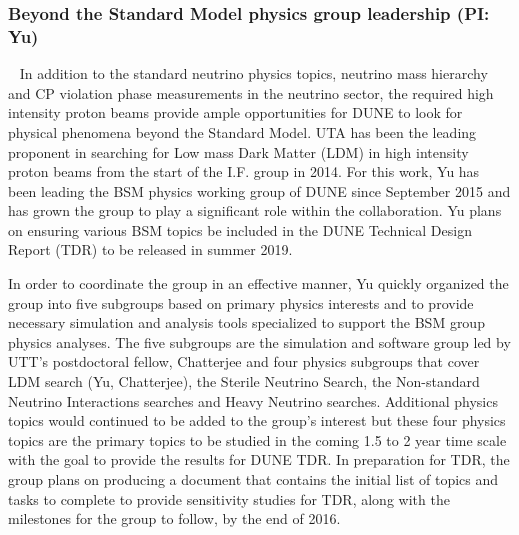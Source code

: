 %
%

%
%

%
%
\subsubsection {Beyond the Standard Model physics group leadership (PI: Yu)}~\label{sec:dune-bsm}
In addition to the standard neutrino physics topics, neutrino mass hierarchy and CP violation phase measurements in the neutrino sector, the required high intensity proton beams provide ample opportunities for DUNE to look for physical phenomena beyond the Standard Model. UTA has been the leading proponent in searching for Low mass Dark Matter (LDM) in high intensity proton beams from the start of the I.F. group in 2014. For this work, Yu has been leading the BSM physics working group of DUNE since September 2015 and has grown the group to play a significant role within the collaboration. Yu plans on ensuring various BSM topics be included in the DUNE Technical Design Report (TDR) to be released in summer 2019.

In order to coordinate the group in an effective manner, Yu quickly organized the group into five subgroups based on primary physics interests and to provide necessary simulation and analysis tools specialized to support the BSM group physics analyses.
The five subgroups are the simulation and software group led by UTT's postdoctoral fellow, Chatterjee and four physics subgroups that cover LDM search (Yu, Chatterjee), the Sterile Neutrino Search, the Non-standard Neutrino Interactions searches and Heavy Neutrino searches. Additional physics topics would continued to be added to the group's interest but these four physics topics are the primary topics to be studied in the coming 1.5 to 2 year time scale with the goal to provide the results for DUNE TDR.
In preparation for TDR, the group plans on producing a document that contains the initial list of topics and tasks to complete to provide
sensitivity studies for TDR, along with the milestones for the group to follow, by the end of 2016. 
%
%

